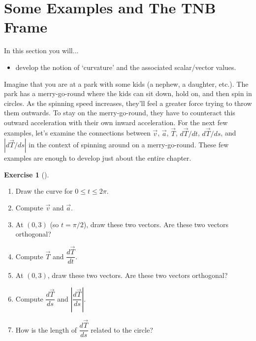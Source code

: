 \documentclass[10pt,]{book}
\theoremstyle{plain}
\theoremstyle{definition}
\theoremstyle{definition}
\theoremstyle{definition}
\theoremstyle{definition}
\newtheorem{exploration}[project]{Exercise}
\theoremstyle{definition}
\numberwithin{equation}{section}
\begin{document}
\section[{Some Examples and The TNB Frame}]{Some Examples and The TNB Frame}\label{section-26}
In this section you will... \leavevmode%
\begin{itemize}[label=\textbullet]
\item{}develop the notion of `curvature' and the associated scalar/vector values.%
\end{itemize}
%
\par
Imagine that you are at a park with some kids (a nephew, a daughter, etc.). The park has a merry-go-round where the kids can sit down, hold on, and then spin in circles. As the spinning speed increases, they'll feel a greater force trying to throw them outwards. To stay on the merry-go-round, they have to counteract this outward acceleration with their own inward acceleration. For the next few examples, let's examine the connections between \(\vec v\), \(\vec a\), \(\vec T\), \(d\vec T/dt\), \(d\vec T/ds\), and \(|d\vec T/ds|\) in the context of spinning around on a merry-go-round. These few examples are enough to develop just about the entire chapter.%
\begin{exploration}[]\label{exploration-170}
\leavevmode%
\begin{enumerate}[font=\bfseries,label=(\alph*),ref=\alph*]
\item\label{task-401} Draw the curve for \(0\leq t\leq 2\pi\).%
\item\label{task-402} Compute \(\vec v\) and \(\vec a\).%
\item\label{task-403} At \((0,3)\) (so \(t=\pi/2\)), draw these two vectors. Are these two vectors orthogonal?%
\item\label{task-404} Compute \(\vec T\) and \(\dfrac{d\vec T}{dt}\).%
\item\label{task-405} At \((0,3)\), draw these two vectors. Are these two vectors orthogonal?%
\item\label{task-406} Compute \(\dfrac{d\vec T}{ds}\) and \(\left|\dfrac{d\vec T}{ds}\right|\).%
\item\label{task-407} How is the length of \(\dfrac{d\vec T}{ds}\) related to the circle?%
\end{enumerate}
\end{exploration}
\end{document}
